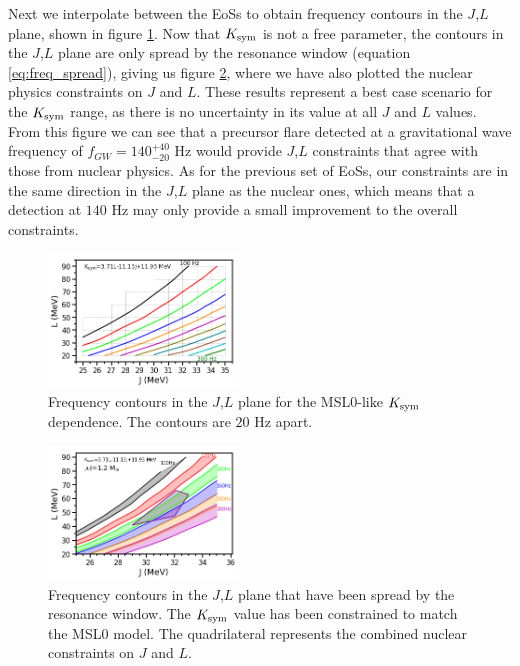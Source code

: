 \documentclass[fleqn,usenatbib]{mnras}
\begin{document}
Next we interpolate between the EoSs to obtain frequency contours in the $J$,$L$ plane, shown in figure \ref{fig:MSL0_contours_20gap}. Now that $K_{\rm sym}$ is not a free parameter, the contours in the $J$,$L$ plane are only spread by the resonance window (equation \ref{eq:freq_spread}), giving us figure \ref{fig:MSL0_shaded_constraints}, where we have also plotted the nuclear physics constraints on $J$ and $L$. These results represent a best case scenario for the $K_{\rm sym}$ range, as there is no uncertainty in its value at all $J$ and $L$ values. From this figure we can see that a precursor flare detected at a gravitational wave frequency of $f_{GW}=140^{+40}_{-20}$ Hz would provide $J$,$L$ constraints that agree with those from nuclear physics. As for the previous set of EoSs, our constraints are in the same direction in the $J$,$L$ plane as the nuclear ones, which means that a detection at $140$ Hz may only provide a small improvement to the overall constraints.

\begin{figure}
\centering
\includegraphics[width=0.45\textwidth,angle=0]{MSL0_contours_20gap}
\caption{Frequency contours in the $J$,$L$ plane for the MSL0-like $K_{\rm sym}$ dependence. The contours are $20$ Hz apart.}
\label{fig:MSL0_contours_20gap}
\end{figure}

\begin{figure}
\centering
\includegraphics[width=0.45\textwidth,angle=0]{MSL0_shaded_constraints}
\caption{Frequency contours in the $J$,$L$ plane that have been spread by the resonance window. The $K_{\rm sym}$ value has been constrained to match the MSL0 model. The quadrilateral represents the combined nuclear constraints on $J$ and $L$.}
\label{fig:MSL0_shaded_constraints}
\end{figure}
\end{document}
